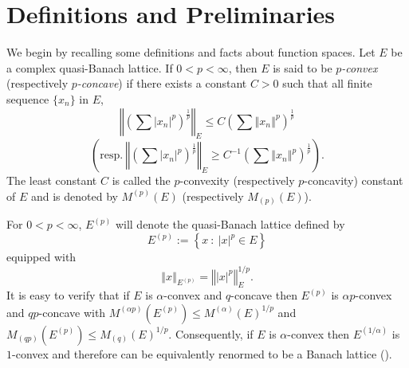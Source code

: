 \documentclass[12pt]{amsart}
\numberwithin{equation}{section}
\numberwithin{theorem}{section}
\begin{document}
  

 





\section{Definitions and  Preliminaries}
We begin by recalling some definitions and facts about function spaces.
Let $E$ be a complex quasi-Banach lattice. If $0<p<\infty$, then $E$
is said to be {\it $p$-convex} (respectively {\it $p$-concave}) if 
there exists a constant $C>0$ such that all finite sequence 
$\{x_n\}$ in $E$,
$$\left\Vert \left(\sum \vert x_n \vert^p \right)^{\frac{1}{p}} 
\right\Vert_E
\leq C \left( \sum \left\Vert x_n \right\Vert^p \right)^{\frac{1}{p}}$$
$$\left( \text{resp.} \ 
\left\Vert \left(\sum \vert x_n \vert^p \right)^{\frac{1}{p}} 
\right\Vert_E
\geq C^{-1} \left( \sum \left\Vert x_n \right\Vert^p \right)^{\frac{1}{p}}
\right).$$
The least constant $C$ is called the $p$-convexity (respectively 
$p$-concavity) constant of $E$ and is denoted by $M^{(p)}(E)$ 
(respectively $M_{(p)}(E)$).

For $0<p<\infty$, $E^{(p)}$ will denote the quasi-Banach lattice defined by
$$E^{(p)} :=\left\{x\ :\  \vert x \vert^p \in E \right\}$$
equipped with 
 $$\left\Vert x \right\Vert_{E^{(p)}} = \left\Vert  \vert x \vert^p
\right\Vert_{E}^{1/p}.$$
It is easy to verify that if $E$ is $\alpha$-convex and $q$-concave then 
$E^{(p)}$ is $\alpha p$-convex and $qp$-concave with 
$M^{(\alpha p)}( E^{(p)})\leq M^{(\alpha)}(E)^{1/p}$ and 
$M_{(q p)}( E^{(p)})\leq M_{(q)}(E)^{1/p}$. Consequently, if $E$ is 
$\alpha$-convex then $E^{(1/\alpha)}$ is $1$-convex and therefore can be 
equivalently renormed to be a Banach lattice (\cite{LT}).
\end{document}
